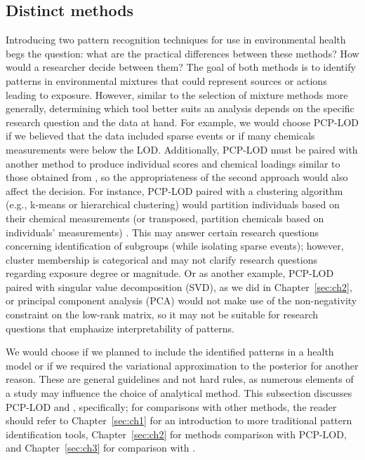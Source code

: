 \subsection{Distinct methods}\label{sec:difference}
Introducing two pattern recognition techniques for use in environmental health begs the question: what are the practical differences between these methods? How would a researcher decide between them? The goal of both methods is to identify patterns in environmental mixtures that could represent sources or actions leading to exposure.  However, similar to the selection of mixture methods more generally, determining which tool better suits an analysis depends on the specific research question and the data at hand. For example, we would choose PCP-LOD if we believed that the data included sparse events or if many chemicals measurements were below the LOD. Additionally, PCP-LOD must be paired with another method to produce individual scores and chemical loadings similar to those obtained from \bnmfc, so the appropriateness of the second approach would also affect the decision. For instance, PCP-LOD paired with a clustering algorithm (e.g., k-means or hierarchical clustering) would partition individuals based on their chemical measurements (or transposed, partition chemicals based on individuals' measurements) \citep{friedman2001elements}. This may answer certain research questions concerning identification of subgroups (while isolating sparse events); however, cluster membership is categorical and may not clarify research questions regarding exposure degree or magnitude. Or as another example, PCP-LOD paired with singular value decomposition (SVD), as we did in Chapter~\ref{sec:ch2}, or principal component analysis (PCA) would not make use of the non-negativity constraint on the low-rank matrix, so it may not be suitable for research questions that emphasize interpretability of patterns.

We would choose \bnmf if we planned to include the identified patterns in a health model or if we required the variational approximation to the posterior for another reason. These are general guidelines and not hard rules, as numerous elements of a study may influence the choice of analytical method. This subsection discusses PCP-LOD and \bnmfc, specifically; for comparisons with other methods, the reader should refer to Chapter~\ref{sec:ch1} for an introduction to more traditional pattern identification tools, Chapter~\ref{sec:ch2} for methods comparison with PCP-LOD, and Chapter~\ref{sec:ch3} for comparison with \bnmf.

